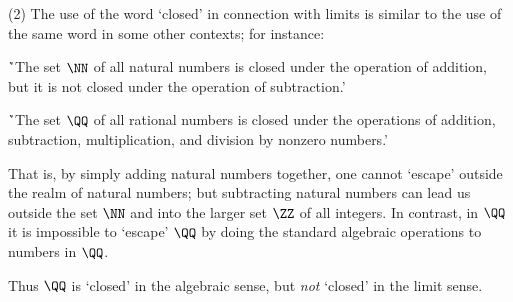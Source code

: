\V

        (2) The use of the word `closed' in connection with limits is similar to the use of the same word in some other contexts;
    for instance:

       \h `The set ${\NN}$ of all natural numbers is closed under the operation of addition, but it is not closed under the operation of subtraction.'

       \h `The set ${\QQ}$ of all rational numbers is closed under the operations of addition, subtraction, multiplication, and division by nonzero numbers.'

\noindent That is, by simply adding natural numbers together, one cannot `escape' outside the realm of natural numbers;
    but subtracting natural numbers can lead us outside the set ${\NN}$ and into the larger set ${\ZZ}$ of all integers.
    In contrast, in ${\QQ}$ it is impossible to `escape' ${\QQ}$ by doing the standard algebraic operations to numbers in ${\QQ}$.

        Thus ${\QQ}$ is `closed' in the algebraic sense, but {\em not} `closed' in the limit sense.


\VV

